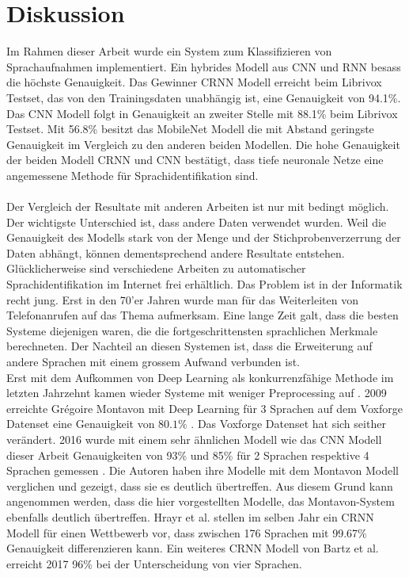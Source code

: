 \section{Diskussion}
Im Rahmen dieser Arbeit wurde ein System zum Klassifizieren von Sprachaufnahmen implementiert. Ein hybrides Modell aus CNN und RNN besass die höchste Genauigkeit. Das Gewinner CRNN Modell erreicht beim Librivox Testset, das von den Trainingsdaten unabhängig ist, eine Genauigkeit von 94.1\%. Das CNN Modell folgt in Genauigkeit an zweiter Stelle mit 88.1\% beim Librivox Testset. Mit 56.8\% besitzt das MobileNet Modell die mit Abstand geringste Genauigkeit im Vergleich zu den anderen beiden Modellen. Die hohe Genauigkeit der beiden Modell CRNN und CNN bestätigt, dass tiefe neuronale Netze eine angemessene Methode für Sprachidentifikation sind.
\\ \\
Der Vergleich der Resultate mit anderen Arbeiten ist nur mit bedingt möglich. Der wichtigste Unterschied ist, dass andere Daten verwendet wurden. Weil die Genauigkeit des Modells stark von der Menge und der Stichprobenverzerrung der Daten abhängt, können dementsprechend andere Resultate entstehen. Glücklicherweise sind verschiedene Arbeiten zu automatischer Sprachidentifikation im Internet frei erhältlich. Das Problem ist in der Informatik recht jung. Erst in den 70'er Jahren wurde man für das Weiterleiten von Telefonanrufen auf das Thema aufmerksam. Eine lange Zeit galt, dass die besten Systeme diejenigen waren, die die fortgeschrittensten sprachlichen Merkmale berechneten. Der Nachteil an diesen Systemen ist, dass die Erweiterung auf andere Sprachen mit einem grossem Aufwand verbunden ist. \parencite{history}
\\
Erst mit dem Aufkommen von Deep Learning als konkurrenzfähige Methode im letzten Jahrzehnt kamen wieder Systeme mit weniger Preprocessing auf \parencite{chollet}. 2009 erreichte Grégoire Montavon mit Deep Learning für 3 Sprachen auf dem Voxforge Datenset eine Genauigkeit von $80.1\%$ \parencite{montavon}. Das Voxforge Datenset hat sich seither verändert. 2016 wurde mit einem sehr ähnlichen Modell wie das CNN Modell dieser Arbeit Genauigkeiten von 93\% und 85\% für 2 Sprachen respektive 4 Sprachen gemessen \parencite{iLID}. Die Autoren haben ihre Modelle mit dem Montavon Modell verglichen und gezeigt, dass sie es deutlich übertreffen. Aus diesem Grund kann angenommen werden, dass die hier vorgestellten Modelle, das Montavon-System ebenfalls deutlich übertreffen. Hrayr et al. \parencite{yerevann} stellen im selben Jahr ein CRNN Modell für einen Wettbewerb vor, dass zwischen 176 Sprachen mit 99.67\% Genauigkeit differenzieren kann. Ein weiteres CRNN Modell von Bartz et al. \parencite{crnn} erreicht 2017 96\% bei der Unterscheidung von vier Sprachen.
